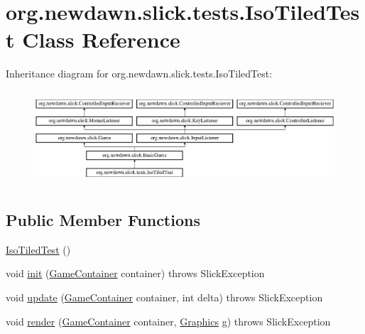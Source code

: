 \hypertarget{classorg_1_1newdawn_1_1slick_1_1tests_1_1_iso_tiled_test}{}\section{org.\+newdawn.\+slick.\+tests.\+Iso\+Tiled\+Test Class Reference}
\label{classorg_1_1newdawn_1_1slick_1_1tests_1_1_iso_tiled_test}
Inheritance diagram for org.\+newdawn.\+slick.\+tests.\+Iso\+Tiled\+Test\+:\begin{figure}[H]
\begin{center}
\leavevmode
\includegraphics[height=3.522012cm]{classorg_1_1newdawn_1_1slick_1_1tests_1_1_iso_tiled_test}
\end{center}
\end{figure}
\subsection*{Public Member Functions}
\begin{DoxyCompactItemize}
\item 
\mbox{\hyperlink{classorg_1_1newdawn_1_1slick_1_1tests_1_1_iso_tiled_test_a270d6b6e63f7271a1caa8cdccb269fe2}{Iso\+Tiled\+Test}} ()
\item 
void \mbox{\hyperlink{classorg_1_1newdawn_1_1slick_1_1tests_1_1_iso_tiled_test_a8933b259f16c538ca712268d4254f24c}{init}} (\mbox{\hyperlink{classorg_1_1newdawn_1_1slick_1_1_game_container}{Game\+Container}} container)  throws Slick\+Exception 
\item 
void \mbox{\hyperlink{classorg_1_1newdawn_1_1slick_1_1tests_1_1_iso_tiled_test_ac5123464946332b31ff9ff2cbb06e24c}{update}} (\mbox{\hyperlink{classorg_1_1newdawn_1_1slick_1_1_game_container}{Game\+Container}} container, int delta)  throws Slick\+Exception 
\item 
void \mbox{\hyperlink{classorg_1_1newdawn_1_1slick_1_1tests_1_1_iso_tiled_test_acb71682241acddc073e360cedff8c4f5}{render}} (\mbox{\hyperlink{classorg_1_1newdawn_1_1slick_1_1_game_container}{Game\+Container}} container, \mbox{\hyperlink{classorg_1_1newdawn_1_1slick_1_1_graphics}{Graphics}} g)  throws Slick\+Exception 
\end{DoxyCompactItemize}
